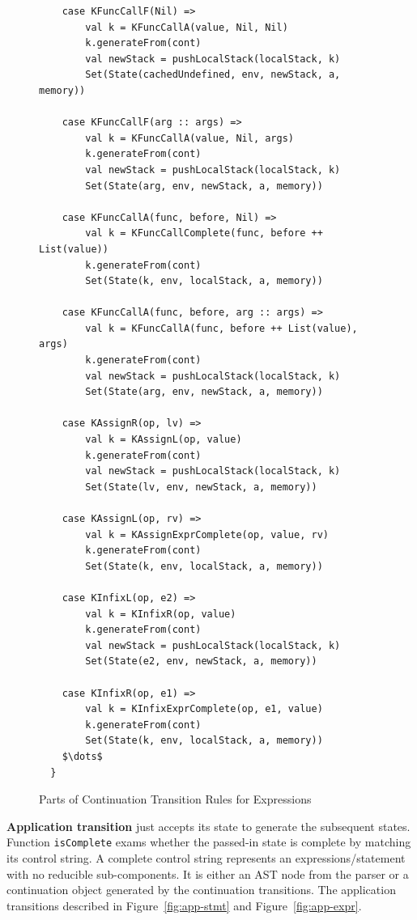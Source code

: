 \documentclass[12pt]{report}
\begin{document}
\begin{figure}
\lstset{language=Scala, mathescape,
basicstyle=\scriptsize\ttfamily}
\begin{lstlisting}
    case KFuncCallF(Nil) =>
        val k = KFuncCallA(value, Nil, Nil)
        k.generateFrom(cont)
        val newStack = pushLocalStack(localStack, k)
        Set(State(cachedUndefined, env, newStack, a, memory))

    case KFuncCallF(arg :: args) =>
        val k = KFuncCallA(value, Nil, args)
        k.generateFrom(cont)
        val newStack = pushLocalStack(localStack, k)
        Set(State(arg, env, newStack, a, memory))

    case KFuncCallA(func, before, Nil) =>
        val k = KFuncCallComplete(func, before ++ List(value))
        k.generateFrom(cont)
        Set(State(k, env, localStack, a, memory))

    case KFuncCallA(func, before, arg :: args) =>
        val k = KFuncCallA(func, before ++ List(value), args)
        k.generateFrom(cont)
        val newStack = pushLocalStack(localStack, k)
        Set(State(arg, env, newStack, a, memory))

    case KAssignR(op, lv) =>
        val k = KAssignL(op, value)
        k.generateFrom(cont)
        val newStack = pushLocalStack(localStack, k)
        Set(State(lv, env, newStack, a, memory))

    case KAssignL(op, rv) =>
        val k = KAssignExprComplete(op, value, rv)
        k.generateFrom(cont)
        Set(State(k, env, localStack, a, memory))

    case KInfixL(op, e2) =>
        val k = KInfixR(op, value)
        k.generateFrom(cont)
        val newStack = pushLocalStack(localStack, k)
        Set(State(e2, env, newStack, a, memory))

    case KInfixR(op, e1) =>
        val k = KInfixExprComplete(op, e1, value)
        k.generateFrom(cont)
        Set(State(k, env, localStack, a, memory))
    $\dots$
  }
\end{lstlisting}
\caption{Parts of Continuation Transition Rules for Expressions}
\label{fig:cont-expr}
\end{figure}

\textbf{Application transition} just accepts its state to generate the subsequent states. Function \verb|isComplete| exams whether the passed-in state is complete by matching its control string.
A complete control string represents an expressions/statement with no reducible sub-components.
It is either an AST node from the parser or a continuation object generated by the continuation transitions.
The application transitions described in Figure~\ref{fig:app-stmt} and Figure~\ref{fig:app-expr}.
\end{document}
